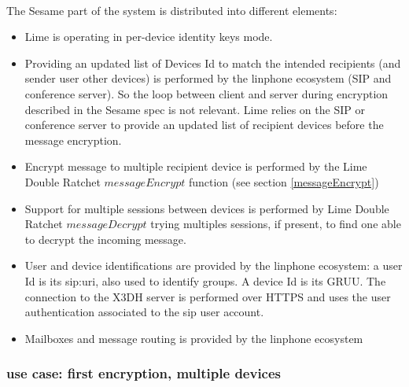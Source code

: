 \documentclass[a4paper,11pt]{article}
\begin{document}
    \paragraph{}The Sesame part of the system is distributed into different elements:
    \begin{itemize}
      \item Lime is operating in per-device identity keys mode.
      \item Providing an updated list of Devices Id to match the intended recipients (and sender user other devices) is performed by the linphone ecosystem (SIP and conference server). So the loop between client and server during encryption described in the Sesame spec\cite{sesame} is not relevant. Lime relies on the SIP or conference server to provide an updated list of recipient devices before the message encryption.
      \item Encrypt message to multiple recipient device is performed by the Lime Double Ratchet $messageEncrypt$ function (see section \ref{messageEncrypt})
      \item Support for multiple sessions between devices is performed by Lime Double Ratchet $messageDecrypt$ trying multiples sessions, if present, to find one able to decrypt the incoming message.
      \item User and device identifications are provided by the linphone ecosystem: a user Id is its sip:uri, also used to identify groups. A device Id is its GRUU\cite{rfc5627}. The connection to the X3DH server is performed over HTTPS and uses the user authentication associated to the sip user account.
      \item Mailboxes and message routing is provided by the linphone ecosystem
    \end{itemize}
    \subsubsection{use case: first encryption, multiple devices}
\end{document}
